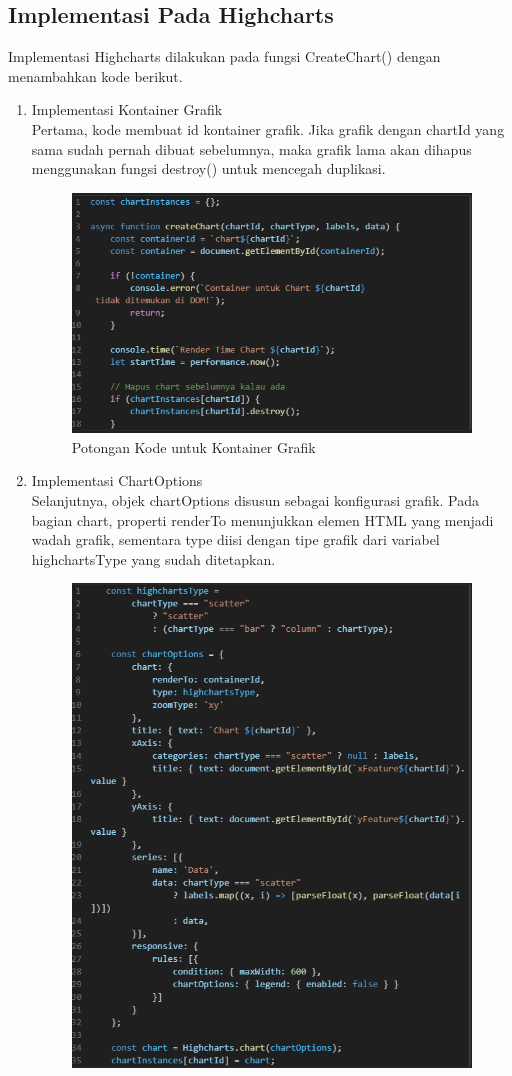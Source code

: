 \subsection{Implementasi Pada Highcharts}
Implementasi Highcharts dilakukan pada fungsi CreateChart() dengan menambahkan kode berikut.\\
\begin{enumerate}
\item Implementasi Kontainer Grafik\\
 Pertama, kode membuat id kontainer grafik. Jika grafik dengan chartId yang sama sudah pernah dibuat sebelumnya, maka grafik lama akan dihapus menggunakan fungsi destroy() untuk mencegah duplikasi. 
		\begin{figure}[H]
	\centering
	\includegraphics[width=0.8\linewidth]{gambar/Pembahasan/Init Highcharts.png}
	\caption{Potongan Kode untuk Kontainer Grafik}
	\label{Potongan Kode untuk Kontainer Grafik}
\end{figure}
\item Implementasi ChartOptions\\
Selanjutnya, objek chartOptions disusun sebagai konfigurasi grafik. Pada bagian chart, properti renderTo menunjukkan elemen HTML yang menjadi wadah grafik, sementara type diisi dengan tipe grafik dari variabel highchartsType yang sudah ditetapkan. 
		\begin{figure}[H]
	\centering
	\includegraphics[width=0.8\linewidth]{gambar/Pembahasan/Membuat chart highcharts.png}

\end{figure}
\end{enumerate}
